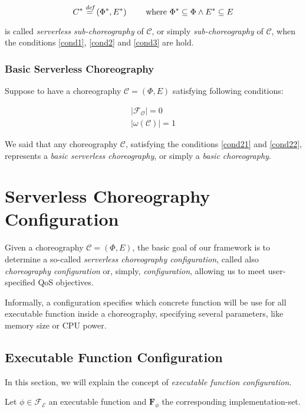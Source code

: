 \begin{equation}
	C^* \overset{\textit{def}}{=} (\Phi^*,E^*) \qquad \text{ where } \Phi^* \subseteq \Phi \wedge E^* \subseteq E
\end{equation}

is called \textit{serverless sub-choreography} of $\mathcal{C}$, or simply \textit{sub-choreography} of $\mathcal{C}$, when the conditions \ref{cond1}, \ref{cond2} and \ref{cond3} are hold.

\subsubsection{Basic Serverless Choreography}\label{BasicDefinition}

Suppose to have a choreography $\mathcal{C} = (\Phi,E)$ satisfying following conditions:

\begin{eqnarray}
	|\mathscr{F_O}| = 0 \label{cond21} \\
	|\omega(\mathcal{C})| = 1 \label{cond22}
\end{eqnarray}

We said that any choreography $\mathcal{C}$, satisfying the conditions \ref{cond21} and \ref{cond22}, represents a \textit{basic serverless choreography}, or simply a \textit{basic choreography}.

\newpage
\section{Serverless Choreography Configuration}

Given a choreography $\mathcal{C} = (\Phi,E)$, the basic goal of our framework is to determine a so-called \textit{serverless choreography configuration}, called also \textit{choreography configuration} or, simply, \textit{configuration}, allowing us to meet user-specified QoS objectives.

Informally, a configuration specifies which concrete function will be use for all executable function inside a choreography, specifying several parameters, like memory size or CPU power.

\subsection{Executable Function Configuration}

In this section, we will explain the concept of \textit{executable function configuration}. 

Let $\phi \in \mathscr{F_E}$ an executable function and $\textbf{F}_{\phi}$ the corresponding implementation-set.

